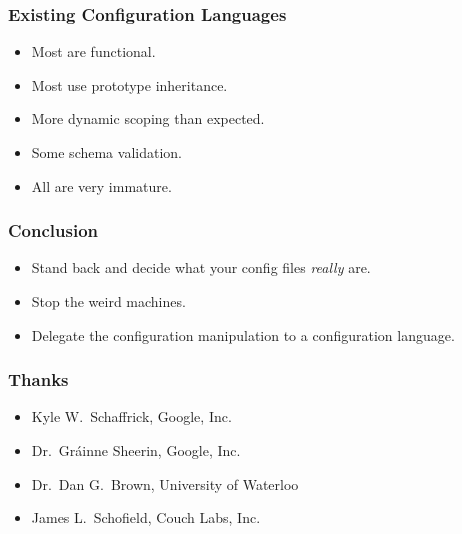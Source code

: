 \documentclass{beamer}
\begin{document}
\begin{frame}\frametitle{Existing Configuration Languages}
\begin{itemize}
\item Most are functional.
\item Most use prototype inheritance.
\item More dynamic scoping than expected.
\item Some schema validation.
\item All are very immature.
\end{itemize}
\end{frame}

\begin{frame}\frametitle{Conclusion}
\begin{itemize}
\item Stand back and decide what your config files \emph{really} are.
\item Stop the weird machines.
\item Delegate the configuration manipulation to a configuration language.
\end{itemize}
\end{frame}

\begin{frame}\frametitle{Thanks}
\begin{itemize}
\item Kyle W.~Schaffrick, Google, Inc.
\item Dr.~Gr\'ainne Sheerin, Google, Inc.
\item Dr.~Dan G.~Brown, University of Waterloo
\item James L.~Schofield, Couch Labs, Inc.
\end{itemize}
\end{frame}
\end{document}
